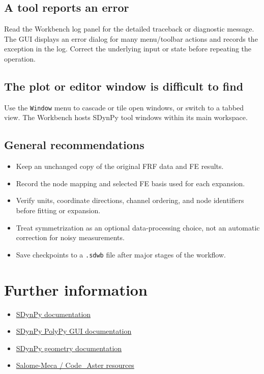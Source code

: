 \documentclass[11pt]{article}
\begin{document}
\subsection{A tool reports an error}
\label{sec:org719a07d}
Read the Workbench log panel for the detailed traceback or diagnostic message. The GUI displays an error dialog for many menu/toolbar actions and records the exception in the log. Correct the underlying input or state before repeating the operation.
\subsection{The plot or editor window is difficult to find}
\label{sec:orgedc9d22}
Use the \texttt{Window} menu to cascade or tile open windows, or switch to a tabbed view. The Workbench hosts SDynPy tool windows within its main workspace.
\subsection{General recommendations}
\label{sec:org677b07e}
\begin{itemize}
\item Keep an unchanged copy of the original FRF data and FE results.
\item Record the node mapping and selected FE basis used for each expansion.
\item Verify units, coordinate directions, channel ordering, and node identifiers before fitting or expansion.
\item Treat symmetrization as an optional data-processing choice, not an automatic correction for noisy measurements.
\item Save checkpoints to a \texttt{.sdwb} file after major stages of the workflow.
\end{itemize}
\section{Further information}
\label{sec:org30f31e7}

\begin{itemize}
\item \href{https://sandialabs.github.io/sdynpy/}{SDynPy documentation}
\item \href{https://sandialabs.github.io/sdynpy/sdynpy-polypy-gui/}{SDynPy PolyPy GUI documentation}
\item \href{https://sandialabs.github.io/sdynpy/geometry/}{SDynPy geometry documentation}
\item \href{https://open-simulation-center.org/fr/downloads/code\_aster/SALOME\_MECA}{Salome-Meca / Code\_Aster resources}
\end{itemize}
\end{document}
